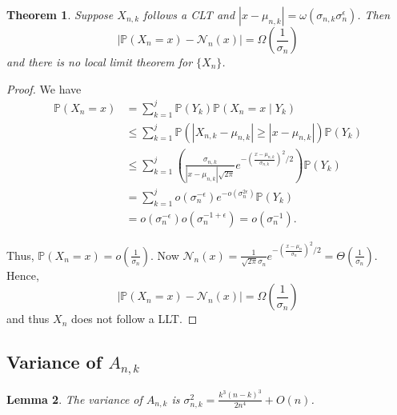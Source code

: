 \documentclass[12pt]{article} %
\newcommand{\p}[1]{\left(#1\right)}
\newcommand{\abs}[1]{\left\lvert#1\right\rvert}
\renewcommand{\P}{\mathbb{P}}
\newtheorem{thm}{Theorem}[section]
\newtheorem{lem}[thm]{Lemma}
\theoremstyle{definition}
\theoremstyle{definition}
\begin{document}
\begin{thm}
Suppose $X_{n,k}$ follows a CLT and $\abs{x - \mu_{n,k}} = \omega(\sigma_{n,k} \sigma_n^{\epsilon})$. Then
\[ \abs{\P(X_n = x) - \mathcal{N}_n(x)} = \Omega\p{\frac{1}{\sigma_n}} \]
and there is no local limit theorem for $\{X_n\}$.
\end{thm}
\begin{proof} We have
\begin{align*}
\P(X_n = x) &= \sum_{k = 1}^j \P(Y_k)\P(X_n = x \mid Y_k) \\
&\leq \sum_{k = 1}^j \P(\abs{X_{n, k}-\mu_{n,k}}\geq \abs{x-\mu_{n,k}}) \P(Y_k) \\
&\leq \sum_{k=1}^j \p{\frac{\sigma_{n,k}}{\abs{x-\mu_{n,k}}\sqrt{2\pi}}e^{-\p{\frac{x-\mu_{n,k}}{\sigma_{n,k}}}^2/2}} \P(Y_k) \\
&= \sum_{k=1}^j {o(\sigma_n^{-\epsilon})e^{-o(\sigma_n^{2\epsilon})} \P(Y_k)} \\
&= o(\sigma_n^{-\epsilon})o(\sigma_n^{-1+\epsilon}) = o(\sigma_n^{-1}).
\end{align*}

Thus, $\P(X_n = x)= o\p{\frac{1}{\sigma_n}}.$ Now $\mathcal{N}_n(x) = \frac{1}{\sqrt{2\pi}\sigma_n} e^{-\p{\frac{x-\mu_n}{\sigma_n}}^2/2} = \Theta\p{\frac{1}{\sigma_n}}$. Hence, \[\abs{\P(X_n = x) - \mathcal{N}_n(x)} = \Omega\p{\frac{1}{\sigma_n}}\] and thus $X_n$ does not follow a LLT. 

\end{proof}


\subsection{Variance of $A_{n,k}$}
\label{var-ank}

\begin{lem}
The variance of $A_{n,k}$ is $\sigma_{n,k}^2 = \frac{k^3(n-k)^3}{2n^4} + O(n)$.
\end{lem}
\end{document}
